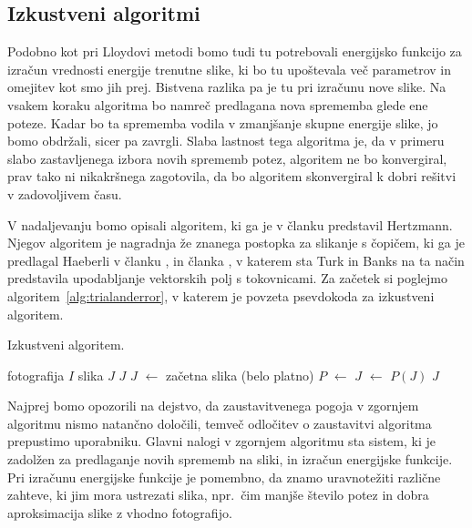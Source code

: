 \subsection{Izkustveni algoritmi}
%
Podobno kot pri Lloydovi metodi bomo tudi tu potrebovali energijsko funkcijo za izračun vrednosti energije trenutne slike, ki bo tu upoštevala več parametrov in omejitev kot smo jih prej. Bistvena razlika pa je tu pri izračunu nove slike. Na vsakem koraku algoritma bo namreč predlagana nova sprememba glede ene poteze. Kadar bo ta sprememba vodila v zmanjšanje skupne energije slike, jo bomo obdržali, sicer pa zavrgli. Slaba lastnost tega algoritma je, da v primeru slabo zastavljenega izbora novih sprememb potez, algoritem ne bo konvergiral, prav tako ni nikakršnega zagotovila, da bo algoritem skonvergiral k dobri rešitvi v zadovoljivem času.

V nadaljevanju bomo opisali algoritem, ki ga je v članku \cite{Hertzmann:Relaxation} predstavil Hertzmann. Njegov algoritem je nagradnja že znanega postopka za slikanje s čopičem, ki ga je predlagal Haeberli v članku \cite{Haeberli:PaintNumbers}, in članka \cite{Turk:Guided}, v katerem sta Turk in Banks na ta način predstavila upodabljanje vektorskih polj s tokovnicami. Za začetek si poglejmo algoritem~\ref{alg:trialanderror}, v katerem je povzeta psevdokoda za izkustveni algoritem.
%
%
\begin{algorithm}[htb]
  \caption{Izkustveni algoritem.}
  \label{alg:trialanderror}
\begin{algorithmic}[1]
\Require fotografija $I$
\Ensure slika $J$
 {$J$}
  \State $J$ $\gets$ začetna slika (belo platno)
    \State $P$ $\gets$ %
       \State $J$ $\gets$ $P(J)$
    \EndIf
  \EndWhile
  \State \Return $J$
\EndFunction
\end{algorithmic}
\end{algorithm}
%

Najprej bomo opozorili na dejstvo, da zaustavitvenega pogoja v zgornjem algoritmu nismo natančno določili, temveč odločitev o zaustavitvi algoritma prepustimo uporabniku. Glavni nalogi v zgornjem algoritmu sta sistem, ki je zadolžen za predlaganje novih sprememb na sliki, in izračun energijske funkcije. Pri izračunu energijske funkcije je pomembno, da znamo uravnotežiti različne zahteve, ki jim mora ustrezati slika, npr.~čim manjše število potez in dobra aproksimacija slike z vhodno fotografijo.
%
